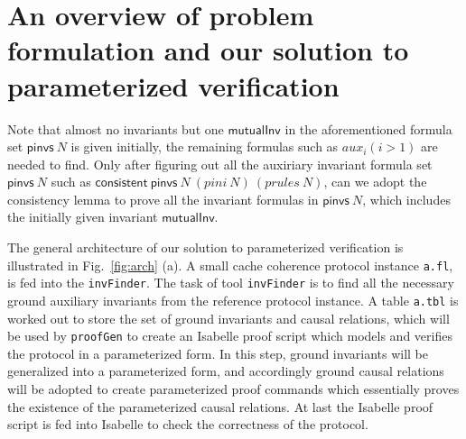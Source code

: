 \documentclass{llncs}
\newcommand\JP[1]{\textcolor{magenta}{JP: #1}}
\begin{document}

\section{An overview of problem formulation and our solution to
parameterized verification} Note that almost no invariants but one
$\mathsf{mutualInv}$ in the aforementioned formula set
$\mathsf{pinvs}~ N$ is given initially,  the remaining formulas such
as $aux_i(i>1)$ are needed to find. Only after figuring out all the
auxiriary invariant formula set $\mathsf{pinvs}~ N$ such as
$\mathsf{consistent}~ \mathsf{pinvs}~ N ~(pini~N)~ (prules~N)$, can
we  adopt the consistency lemma to prove all the invariant formulas
in $\mathsf{pinvs}~ N$, which includes the initially given invariant
 $\mathsf{mutualInv}$.

The general architecture of  our solution  to parameterized
verification is illustrated in Fig.~\ref{fig:arch} (a). A small
cache coherence protocol instance {\tt a.fl}, is fed into the
\texttt{invFinder}. The task of tool \texttt{invFinder} is to find
all the necessary ground auxiliary invariants from the reference
protocol instance.
 A table {\tt a.tbl} is worked out  to store the set of ground invariants and
 causal relations, which will be  used by {\tt proofGen} to
create an Isabelle proof   script which models and verifies the
protocol in a parameterized form. In this step, ground invariants
will be generalized into a parameterized form, and accordingly
ground causal relations will be adopted to create parameterized
proof commands which essentially proves the existence of the
parameterized causal relations. At last the Isabelle proof script is
fed into   Isabelle to check the correctness of the protocol.
\end{document}
